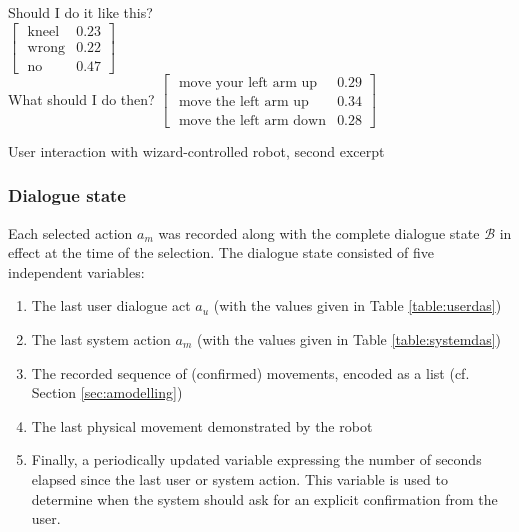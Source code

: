 \begin{Transcript}[p!]
\begin{dialogue}
 \vspace{3mm}
 Should I do it like this? \\
 $\begin{bmatrix}\text{ kneel} & 0.23 \\
\text{ wrong} & 0.22 \\
\text{ no} & 0.47 \end{bmatrix}$ \vspace{3mm} \\
 \vspace{2mm}
 What should I do then?  \vspace{3mm}
 $\begin{bmatrix}\text{ move your left arm up} & 0.29 \\
\text{ move the left arm up} & 0.34 \\
\text{ move the left arm down} & 0.28 \end{bmatrix}$ \vspace{3mm} \\
\end{dialogue}
\vspace{-4mm} \hspace{1cm}  \vspace{3mm}
\caption{User interaction with wizard-controlled robot, second excerpt}
\end{Transcript}

\subsubsection*{Dialogue state}

Each selected action $a_m$ was recorded along with the complete dialogue state $\mathcal{B}$ in effect at the time of the selection. The dialogue state consisted of five independent variables: \begin{enumerate}
\item The last user dialogue act $a_u$ (with the values given in Table \ref{table:userdas})
\item The last system action $a_m$ (with the values given in Table \ref{table:systemdas})
\item The recorded sequence of (confirmed) movements, encoded as a list (cf. Section \ref{sec:amodelling})
\item The last physical movement demonstrated by the robot
\item Finally, a periodically updated variable expressing the number of seconds elapsed since the last user or system action.  This variable is used to determine when the system should ask for an explicit confirmation from the user.
\end{enumerate}

